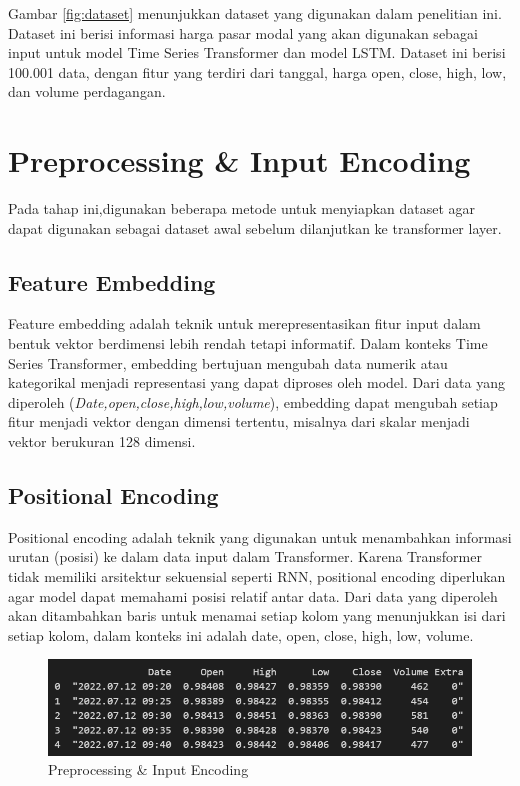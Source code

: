 Gambar \ref{fig:dataset} menunjukkan dataset yang digunakan dalam penelitian ini. Dataset ini berisi informasi harga pasar modal yang akan digunakan sebagai input untuk model Time Series Transformer dan model LSTM. Dataset ini berisi 100.001 data, dengan fitur yang terdiri dari tanggal, harga open, close, high, low, dan volume perdagangan. 

\section{Preprocessing \& Input Encoding}
Pada tahap ini,digunakan beberapa metode untuk menyiapkan dataset agar dapat digunakan sebagai dataset awal sebelum dilanjutkan ke transformer layer.


\subsection{\textbf{Feature Embedding}} Feature embedding adalah teknik untuk merepresentasikan fitur input dalam bentuk vektor berdimensi lebih rendah tetapi informatif. Dalam konteks Time Series Transformer, embedding bertujuan mengubah data numerik atau kategorikal menjadi representasi yang dapat diproses oleh model. Dari data yang diperoleh (\textit{Date,open,close,high,low,volume}), embedding dapat mengubah setiap fitur menjadi vektor dengan dimensi tertentu, misalnya dari skalar menjadi vektor berukuran 128 dimensi.

\subsection{\textbf{Positional Encoding}} Positional encoding adalah teknik yang digunakan untuk menambahkan informasi urutan (posisi) ke dalam data input dalam Transformer. Karena Transformer tidak memiliki arsitektur sekuensial seperti RNN, positional encoding diperlukan agar model dapat memahami posisi relatif antar data. Dari data yang diperoleh akan ditambahkan baris untuk menamai setiap kolom yang menunjukkan isi dari setiap kolom, dalam konteks ini adalah date, open, close, high, low, volume.

\begin{figure} [H] \centering
\includegraphics[scale=1.0]{gambar/positional encoding.png} 
\caption{Preprocessing \& Input Encoding}
\label{fig:positionalencoding}
\end{figure}

